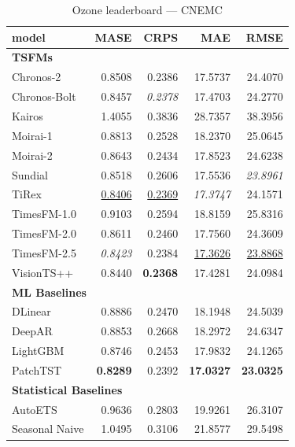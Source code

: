 \begin{table}[H]
\caption{Ozone leaderboard --- CNEMC}
\centering
\begin{small}
\begin{tabular}{lrrrr}
\toprule
model & MASE & CRPS & MAE & RMSE \\
\midrule
\multicolumn{5}{l}{\textbf{TSFMs}} \\
Chronos-2 & 0.8508 & 0.2386 & 17.5737 & 24.4070 \\
Chronos-Bolt & 0.8457 & \textit{0.2378} & 17.4703 & 24.2770 \\
Kairos & 1.4055 & 0.3836 & 28.7357 & 38.3956 \\
Moirai-1 & 0.8813 & 0.2528 & 18.2370 & 25.0645 \\
Moirai-2 & 0.8643 & 0.2434 & 17.8523 & 24.6238 \\
Sundial & 0.8518 & 0.2606 & 17.5536 & \textit{23.8961} \\
TiRex & \underline{0.8406} & \underline{0.2369} & \textit{17.3747} & 24.1571 \\
TimesFM-1.0 & 0.9103 & 0.2594 & 18.8159 & 25.8316 \\
TimesFM-2.0 & 0.8611 & 0.2460 & 17.7560 & 24.3609 \\
TimesFM-2.5 & \textit{0.8423} & 0.2384 & \underline{17.3626} & \underline{23.8868} \\
VisionTS++ & 0.8440 & \textbf{0.2368} & 17.4281 & 24.0984 \\
\midrule
\multicolumn{5}{l}{\textbf{ML Baselines}} \\
DLinear & 0.8886 & 0.2470 & 18.1948 & 24.5039 \\
DeepAR & 0.8853 & 0.2668 & 18.2972 & 24.6347 \\
LightGBM & 0.8746 & 0.2453 & 17.9832 & 24.1265 \\
PatchTST & \textbf{0.8289} & 0.2392 & \textbf{17.0327} & \textbf{23.0325} \\
\midrule
\multicolumn{5}{l}{\textbf{Statistical Baselines}} \\
AutoETS & 0.9636 & 0.2803 & 19.9261 & 26.3107 \\
Seasonal Naive & 1.0495 & 0.3106 & 21.8577 & 29.5498 \\
\bottomrule
\end{tabular}
\end{small}
\end{table}